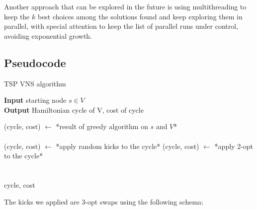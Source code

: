 Another approach that can be explored in the future is using multithreading to keep the $k$ best choices among the solutions found and keep exploring them in parallel, with special attention to keep the list of parallel runs under control, avoiding exponential growth.

\newpage

\subsection{Pseudocode}

\begin{algorithm}
    \caption{TSP VNS algorithm}
    
    \textbf{Input} starting node $s\in V$\\
    \textbf{Output} Hamiltonian cycle of V, cost of cycle\\
    \begin{algorithmic}
        
        \State (cycle, cost) $\gets$ *result of greedy algorithm on $s$ and $V$*\\

        \\

            \State (cycle, cost) $\gets$ *apply random kicks to the cycle*
            \State (cycle, cost) $\gets$ *apply 2-opt to the cycle*\\

        \EndWhile\\\\

        \Return cycle, cost
    \end{algorithmic}
\end{algorithm}

The kicks we applied are 3-opt swaps using the following schema:

